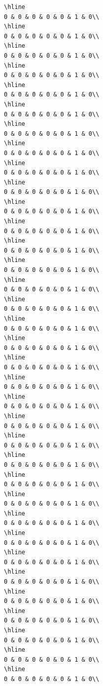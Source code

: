 \documentclass[
]{article}
\begin{document}
\begin{verbatim}
\hline
0 & 0 & 0 & 0 & 0 & 1 & 0\\
\hline
0 & 0 & 0 & 0 & 0 & 1 & 0\\
\hline
0 & 0 & 0 & 0 & 0 & 1 & 0\\
\hline
0 & 0 & 0 & 0 & 0 & 1 & 0\\
\hline
0 & 0 & 0 & 0 & 0 & 1 & 0\\
\hline
0 & 0 & 0 & 0 & 0 & 1 & 0\\
\hline
0 & 0 & 0 & 0 & 0 & 1 & 0\\
\hline
0 & 0 & 0 & 0 & 0 & 1 & 0\\
\hline
0 & 0 & 0 & 0 & 0 & 1 & 0\\
\hline
0 & 0 & 0 & 0 & 0 & 1 & 0\\
\hline
0 & 0 & 0 & 0 & 0 & 1 & 0\\
\hline
0 & 0 & 0 & 0 & 0 & 1 & 0\\
\hline
0 & 0 & 0 & 0 & 0 & 1 & 0\\
\hline
0 & 0 & 0 & 0 & 0 & 1 & 0\\
\hline
0 & 0 & 0 & 0 & 0 & 1 & 0\\
\hline
0 & 0 & 0 & 0 & 0 & 1 & 0\\
\hline
0 & 0 & 0 & 0 & 0 & 1 & 0\\
\hline
0 & 0 & 0 & 0 & 0 & 1 & 0\\
\hline
0 & 0 & 0 & 0 & 0 & 1 & 0\\
\hline
0 & 0 & 0 & 0 & 0 & 1 & 0\\
\hline
0 & 0 & 0 & 0 & 0 & 1 & 0\\
\hline
0 & 0 & 0 & 0 & 0 & 1 & 0\\
\hline
0 & 0 & 0 & 0 & 0 & 1 & 0\\
\hline
0 & 0 & 0 & 0 & 0 & 1 & 0\\
\hline
0 & 0 & 0 & 0 & 0 & 1 & 0\\
\hline
0 & 0 & 0 & 0 & 0 & 1 & 0\\
\hline
0 & 0 & 0 & 0 & 0 & 1 & 0\\
\hline
0 & 0 & 0 & 0 & 0 & 1 & 0\\
\hline
0 & 0 & 0 & 0 & 0 & 1 & 0\\
\hline
0 & 0 & 0 & 0 & 0 & 1 & 0\\
\hline
0 & 0 & 0 & 0 & 0 & 1 & 0\\
\hline
0 & 0 & 0 & 0 & 0 & 1 & 0\\
\hline
0 & 0 & 0 & 0 & 0 & 1 & 0\\
\hline
0 & 0 & 0 & 0 & 0 & 1 & 0\\
\hline
0 & 0 & 0 & 0 & 0 & 1 & 0\\

\end{verbatim}
\end{document}
